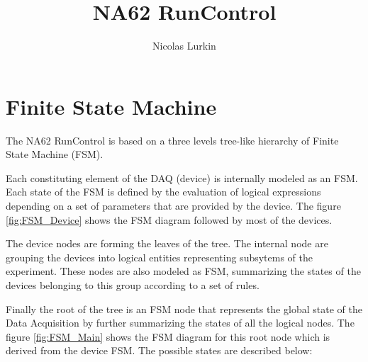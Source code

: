 \documentclass[a4paper]{article}
\title{NA62 RunControl}
\author{Nicolas Lurkin}
\begin{document}
\maketitle

\section{Finite State Machine}
The NA62 RunControl is based on a three levels tree-like hierarchy of Finite State Machine (FSM). 

Each constituting element of the DAQ (device) is internally modeled as an FSM. Each state of the
FSM is defined by the evaluation of logical expressions depending on a set of parameters that are
provided by the device. The figure \ref{fig:FSM_Device} shows the FSM diagram followed by most of
the devices.

The device nodes are forming the leaves of the tree. The internal node are grouping the devices into
logical entities representing subsytems of the experiment. These nodes are also modeled as FSM,
summarizing the states of the devices belonging to this group according to a set of rules.

Finally the root of the tree is an FSM node that represents the global state of the Data Acquisition
by further summarizing the states of all the logical nodes. The figure \ref{fig:FSM_Main} shows the
FSM diagram for this root node which is derived from the device FSM. The possible states are
described below:
\end{document}

